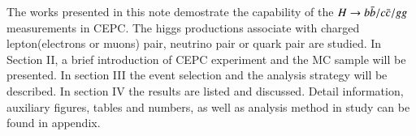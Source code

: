 The works presented in this note demostrate the capability of the $H \rightarrow b\bar{b}/c\bar{c}/gg$ measurements in CEPC.
The higgs productions associate with charged lepton(electrons or muons) pair, neutrino pair or quark pair are studied.
 In Section II, a brief introduction of CEPC experiment and the MC sample will be presented. In section III the event selection and the analysis strategy will be described. In section IV the results are listed and discussed. Detail information, auxiliary figures, tables and numbers, as well as analysis method in study can be found in appendix.
\par
\clearpage